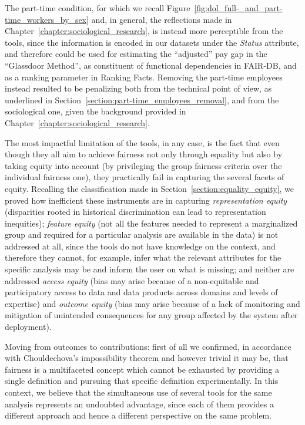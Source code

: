 The part-time condition, for which we recall Figure~\ref{fig:dol_full-_and_part-time_workers_by_sex} and, in general, the reflections made in Chapter~\ref{chapter:sociological_research}, is instead more perceptible from the tools, since the information is encoded in our datasets under the \textit{Status} attribute, and therefore could be used for estimating the ``adjusted'' pay gap in the ``Glassdoor Method'', as constituent of functional dependencies in FAIR-DB, and as a ranking parameter in Ranking Facts. Removing the part-time employees instead resulted to be penalizing both from the technical point of view, as underlined in Section~\ref{section:part-time_employees_removal}, and from the sociological one, given the background provided in Chapter~\ref{chapter:sociological_research}.

The most impactful limitation of the tools, in any case, is the fact that even though they all aim to achieve fairness not only through equality but also by taking equity into account (by privileging the group fairness criteria over the individual fairness one), they practically fail in capturing the several facets of equity. Recalling the classification made in Section~\ref{section:equality_equity}, we proved how inefficient these instruments are in capturing \textit{representation equity} (disparities rooted in historical discrimination can lead to representation inequities); \textit{feature equity} (not all the features needed to represent a marginalized group and required for a particular analysis are available in the data) is not addressed at all, since the tools do not have knowledge on the context, and therefore they cannot, for example, infer what the relevant attributes for the specific analysis may be and inform the user on what is missing; and neither are addressed \textit{access equity} (bias may arise because of a non-equitable and participatory access to data and data products across domains and levels of expertise) and \textit{outcome equity} (bias may arise because of a lack of monitoring and mitigation of unintended consequences for any group affected by the system after deployment).

Moving from outcomes to contributions: first of all we confirmed, in accordance with Chouldechova's impossibility theorem \cite{chouldechova2017fair} and however trivial it may be, that fairness is a multifaceted concept which cannot be exhausted by providing a single definition and pursuing that specific definition experimentally. In this context, we believe that the simultaneous use of several tools for the same analysis represents an undoubted advantage, since each of them provides a different approach and hence a different perspective on the same problem.

